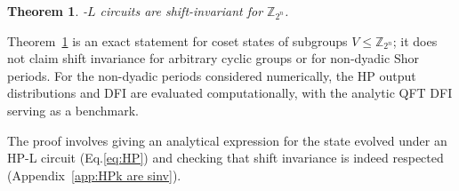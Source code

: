 \documentclass[reprint, aps, prl, superscriptaddress]{revtex4-2}
\renewcommand{\section}[1]{\par\medskip\noindent\textbf{{\textit{#1.}---}}}
\newcommand{\myqc}{\text{HP}}
\newtheorem{theorem}{Theorem}
\begin{document}
\begin{theorem}
\label{thm:hp_circuits_are_sinv}
    \myqc-$L$ circuits are shift-invariant for $\mathbb{Z}_{2^{n}}$.
\end{theorem}

Theorem~\ref{thm:hp_circuits_are_sinv} is an exact statement for coset states of subgroups \(V\leq\mathbb{Z}_{2^n}\); it does not claim shift invariance for arbitrary cyclic groups or for non-dyadic Shor periods. For the non-dyadic periods considered numerically, the HP output distributions and DFI are evaluated computationally, with the analytic QFT DFI serving as a benchmark.

The proof involves giving an analytical expression for the state evolved under an HP-L circuit (Eq.\eqref{eq:HP}) and checking that shift invariance is indeed respected (Appendix~\ref{app:HPk are sinv}).







\end{document}

